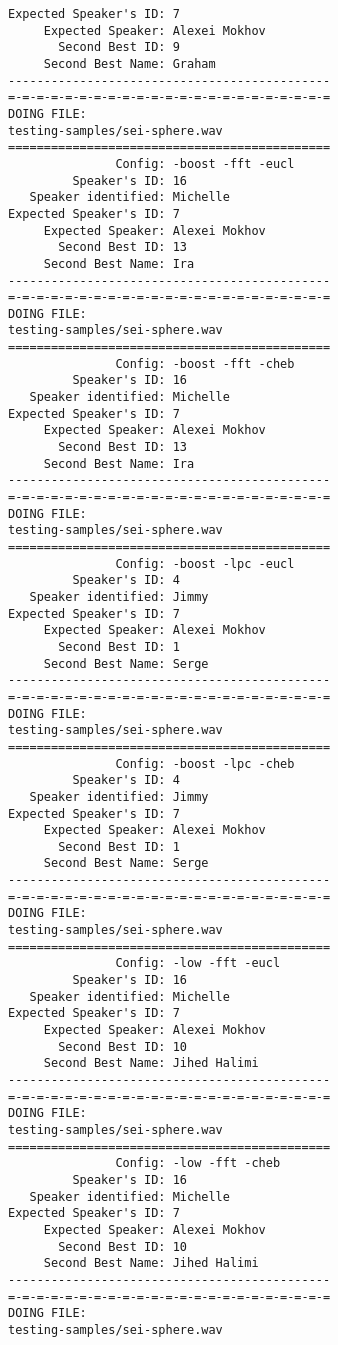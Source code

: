 \begin{verbatim}
Expected Speaker's ID: 7
     Expected Speaker: Alexei Mokhov
       Second Best ID: 9
     Second Best Name: Graham
---------------------------------------------
=-=-=-=-=-=-=-=-=-=-=-=-=-=-=-=-=-=-=-=-=-=-=
DOING FILE:
testing-samples/sei-sphere.wav
=============================================
               Config: -boost -fft -eucl
         Speaker's ID: 16
   Speaker identified: Michelle
Expected Speaker's ID: 7
     Expected Speaker: Alexei Mokhov
       Second Best ID: 13
     Second Best Name: Ira
---------------------------------------------
=-=-=-=-=-=-=-=-=-=-=-=-=-=-=-=-=-=-=-=-=-=-=
DOING FILE:
testing-samples/sei-sphere.wav
=============================================
               Config: -boost -fft -cheb
         Speaker's ID: 16
   Speaker identified: Michelle
Expected Speaker's ID: 7
     Expected Speaker: Alexei Mokhov
       Second Best ID: 13
     Second Best Name: Ira
---------------------------------------------
=-=-=-=-=-=-=-=-=-=-=-=-=-=-=-=-=-=-=-=-=-=-=
DOING FILE:
testing-samples/sei-sphere.wav
=============================================
               Config: -boost -lpc -eucl
         Speaker's ID: 4
   Speaker identified: Jimmy
Expected Speaker's ID: 7
     Expected Speaker: Alexei Mokhov
       Second Best ID: 1
     Second Best Name: Serge
---------------------------------------------
=-=-=-=-=-=-=-=-=-=-=-=-=-=-=-=-=-=-=-=-=-=-=
DOING FILE:
testing-samples/sei-sphere.wav
=============================================
               Config: -boost -lpc -cheb
         Speaker's ID: 4
   Speaker identified: Jimmy
Expected Speaker's ID: 7
     Expected Speaker: Alexei Mokhov
       Second Best ID: 1
     Second Best Name: Serge
---------------------------------------------
=-=-=-=-=-=-=-=-=-=-=-=-=-=-=-=-=-=-=-=-=-=-=
DOING FILE:
testing-samples/sei-sphere.wav
=============================================
               Config: -low -fft -eucl
         Speaker's ID: 16
   Speaker identified: Michelle
Expected Speaker's ID: 7
     Expected Speaker: Alexei Mokhov
       Second Best ID: 10
     Second Best Name: Jihed Halimi
---------------------------------------------
=-=-=-=-=-=-=-=-=-=-=-=-=-=-=-=-=-=-=-=-=-=-=
DOING FILE:
testing-samples/sei-sphere.wav
=============================================
               Config: -low -fft -cheb
         Speaker's ID: 16
   Speaker identified: Michelle
Expected Speaker's ID: 7
     Expected Speaker: Alexei Mokhov
       Second Best ID: 10
     Second Best Name: Jihed Halimi
---------------------------------------------
=-=-=-=-=-=-=-=-=-=-=-=-=-=-=-=-=-=-=-=-=-=-=
DOING FILE:
testing-samples/sei-sphere.wav

\end{verbatim}
